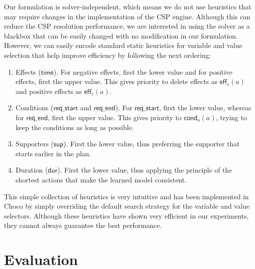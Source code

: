 \documentclass[runningheads]{llncs}
\newcommand{\eff}{\mathsf{eff}}    %
\newcommand{\cond}{\mathsf{cond}}  %
\newcommand{\dur}{\mathsf{dur}}    %
\newcommand{\supp}{\mathsf{sup}}   %
\newcommand{\tim}{\mathsf{time}}   %
\newcommand{\reqs}{\mathsf{req\_{start}}} %
\newcommand{\reqe}{\mathsf{req\_{end}}}   %
\begin{document}
Our formulation is solver-independent, which means we do not use heuristics that may require changes in the implementation of the CSP engine.
Although this can reduce the CSP resolution performance, we are interested in using the solver as a blackbox that can be easily changed with no modification in our formulation. However, we can easily encode standard static heuristics for variable and value selection that help improve efficiency by following the next ordering:



\begin{enumerate}
  \item Effects ($\tim$). For negative effects, first the lower value and for positive effects, first the upper value. This gives priority to delete effects as $\eff_s(a)$ and positive effects as $\eff_e(a)$.
  \item Conditions ($\reqs$ and $\reqe$). For $\reqs$, first the lower value, whereas for $\reqe$, first the upper value. This gives priority to $\cond_o(a)$, trying to keep the conditions as long as possible.
  \item Supporters ($\supp$). First the lower value, thus preferring the supporter that starts earlier in the plan.
  \item Duration ($\dur$). First the lower value, thus applying the principle of the shortest actions that make the learned model consistent.
\end{enumerate}


This simple collection of heuristics is very intuitive and has been implemented in \textsf{Choco} by simply overriding the default search strategy for the variable and value selectors. Although these heuristics have shown very efficient in our experiments, they cannot always guarantee the best performance.



\section{Evaluation}
\label{sec:evaluation}
\end{document}
